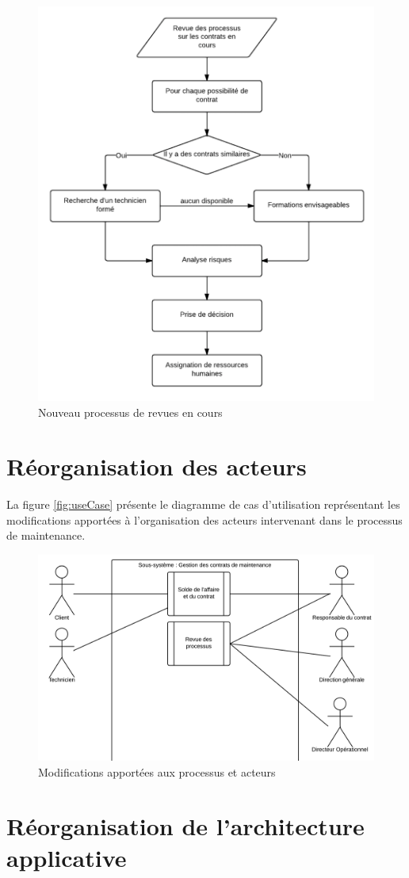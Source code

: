 \begin{figure}[h!]
	\centering
	\includegraphics[width=0.45\linewidth]{images/processus_revues_actuels.png}
	\caption{Nouveau processus de revues en cours}
	\label{fig:processusRevueCours}
\end{figure}

\section{Réorganisation des acteurs}
La figure \vref{fig:useCase} présente le diagramme de cas d'utilisation représentant les modifications apportées à l'organisation des acteurs intervenant dans le processus de maintenance.
\begin{figure}[h!]
	\centering
	\includegraphics[width=1\linewidth]{images/useCase.png}
	\caption{Modifications apportées aux processus et acteurs}
	\label{fig:useCase}
\end{figure}



\section{Réorganisation de l'architecture applicative}
